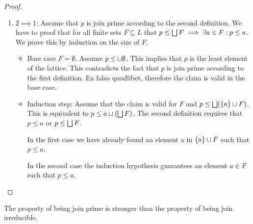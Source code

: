 \begin{definition}
\begin{proof}
\begin{enumerate}
            \item $2 \implies 1$: Assume that $p$ is join prime according to the
                second definition. We have to proof that for all finite sets $F
                \subseteq L$ that $p \le \bigsqcup F \implies \exists a \in F: p
                \le a$. We prove this by induction on the size of $F$.

                \begin{itemize}
                    \item Base case $F = \emptyset$. Assume $p \le \sqcup
                        \emptyset$. This implies that $p$ is the least element
                        of the lattice. This contradicts the fact that $p$ is
                        join prime according to the first definition. Ex falso
                        quodlibet, therefore the claim is valid in the base
                        case.

                    \item Induction step: Assume that the claim is valid for $F$
                        and $p \le \bigsqcup(\left\{a\right\} \cup F)$. This is equivalent
                        to $p \le a \sqcup (\bigsqcup F)$. The second definition
                        requires that $p \le a$ or $p \le \bigsqcup F$.

                        In the first case we have already found an element $a$ in
                        $\left\{a\right\} \cup F$ such that $p \le a$.

                        In the second case the induction hypothesis guarantees
                        an element $a \in F$ such that $p \le a$.
                \end{itemize}
        \end{enumerate}
    \end{proof}
\end{definition}



The property of being join prime is stronger than the property of being join
irreducible.


